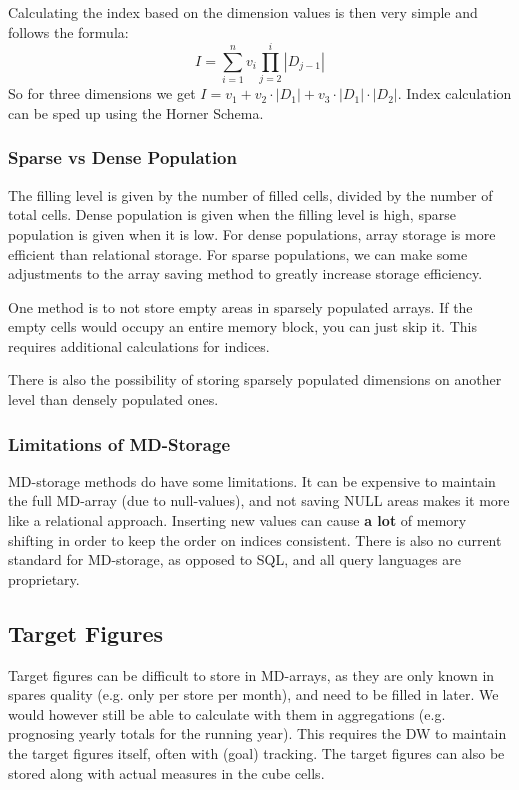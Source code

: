 \documentclass{article}
\begin{document}
Calculating the index based on the dimension values is then very simple and follows the formula:
\begin{equation}
    I = \sum_{i=1}^n v_i \prod_{j=2}^i |D_{j-1}|
\end{equation}
So for three dimensions we get $I = v_1 + v_2 \cdot |D_1| + v_3 \cdot |D_1| \cdot |D_2|$.
Index calculation can be sped up using the Horner Schema.

\subsubsection{Sparse vs Dense Population}
The filling level is given by the number of filled cells, divided by the number of total cells.
Dense population is given when the filling level is high, sparse population is given when it is low.
For dense populations, array storage is more efficient than relational storage.
For sparse populations, we can make some adjustments to the array saving method to greatly increase storage efficiency.

One method is to not store empty areas in sparsely populated arrays.
If the empty cells would occupy an entire memory block, you can just skip it.
This requires additional calculations for indices.

There is also the possibility of storing sparsely populated dimensions on another level than densely populated ones.

\subsubsection{Limitations of MD-Storage}
\label{limitations}
MD-storage methods do have some limitations.
It can be expensive to maintain the full MD-array (due to null-values), and not saving NULL areas makes it more like a relational approach.
Inserting new values can cause \textbf{a lot} of memory shifting in order to keep the order on indices consistent.
There is also no current standard for MD-storage, as opposed to SQL, and all query languages are proprietary.

\subsection{Target Figures}
Target figures can be difficult to store in MD-arrays, as they are only known in spares quality (e.g. only per store per month), and need to be filled in later.
We would however still be able to calculate with them in aggregations (e.g. prognosing yearly totals for the running year).
This requires the DW to maintain the target figures itself, often with (goal) tracking.
The target figures can also be stored along with actual measures in the cube cells.
\end{document}
